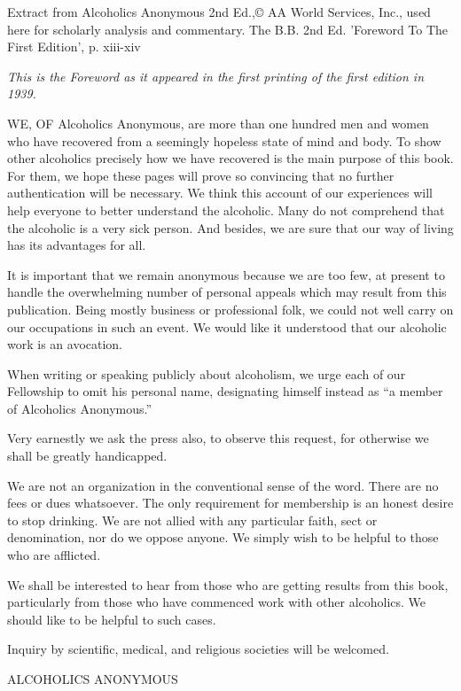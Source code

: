 

Extract from Alcoholics Anonymous 2nd Ed.,© AA World Services, Inc., 
    used here for scholarly analysis and commentary.
The B.B. 2nd Ed. 'Foreword To The First Edition', p. xiii-xiv

\begin{biblechapter}
 \begin{centering}\emph{
    This is the Foreword as it appeared in the first 
    printing of the first edition in 1939.
}
\end{centering}

    WE, OF Alcoholics Anonymous, 
    are more than one hundred men and women 
    who have recovered from a seemingly hopeless state 
    of mind and body. 
\verse To show other alcoholics precisely how we have recovered 
    is the main purpose of this book. 
\verse For them, we hope these pages will prove so convincing 
    that no further authentication will be necessary. 
\verse We think this account of our experiences will help everyone 
    to better understand the alcoholic. 
\verse Many do not comprehend that the alcoholic is a very sick person.
\verse And besides, 
    we are sure that our way of living has its advantages for all. 

    It is important that we remain anonymous 
    because we are too few, at present 
    to handle the overwhelming number of personal appeals 
    which may result from this publication. 
\verse Being mostly business or professional folk, 
    we could not well carry on our occupations in such an event. 
\verse We would like it understood that our alcoholic work is an avocation. 

\verse When writing or speaking publicly about alcoholism, 
    we urge each of our Fellowship to omit his personal name, 
    designating himself instead as 
    “a member of Alcoholics Anonymous.”

\verse Very earnestly we ask the press also, 
    to observe this request, 
    for otherwise we shall be greatly handicapped.

    We are not an organization in the conventional sense of the word.
\verse There are no fees or dues whatsoever. 
\verse The only requirement for membership is an honest desire to stop drinking. 
\verse We are not allied with any particular faith, sect or denomination, 
    nor do we oppose anyone.
\verse We simply wish to be helpful to those who are afflicted. 

    We shall be interested to hear from those 
    who are getting results from this book, 
    particularly from those who have commenced work with other alcoholics.
\verse We should like to be helpful to such cases. 

\verse Inquiry by scientific, medical, and religious societies 
    will be welcomed. 

\verse ALCOHOLICS ANONYMOUS
\end{biblechapter}
